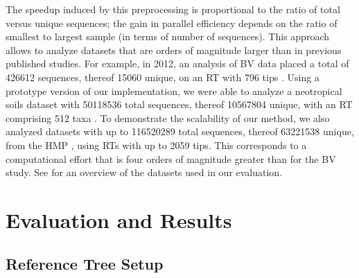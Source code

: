 The speedup induced by this preprocessing is proportional to the ratio of total versus unique sequences;
the gain in parallel efficiency depends on the ratio of smallest to largest sample (in terms of number of sequences).
This approach allows to analyze datasets that are orders of magnitude larger than in previous published studies.
For example, in 2012, an analysis of \acf{BV} data
placed a total of \num{426 612} sequences, thereof \num{15 060} unique,
on an \ac{RT} with \num{796} tips \cite{Srinivasan2012}.
Using a prototype version of our implementation,
we were able to analyze a neotropical soils dataset with \num{50 118 536} total sequences, thereof \num{10 567 804} unique,
with an \ac{RT} comprising \num{512} taxa \cite{Mahe2017}.
To demonstrate the scalability of our method,
we also analyzed datasets with up to \num{116 520 289} total sequences, thereof \num{63 221 538} unique,
from the \ac{HMP} \cite{Huttenhower2012,Methe2012}, using \acp{RT} with up to \num{2 059} tips.
This corresponds to %
a computational effort that is four orders of magnitude greater than for the \ac{BV} study.
See  for an overview of the datasets used in our evaluation.


\section{Evaluation and Results}
\label{ch:AutomaticTrees:sec:Evaluation}


\subsection{Reference Tree Setup}
\label{ch:AutomaticTrees:sec:Evaluation:sub:ReferenceTreeSetup}

